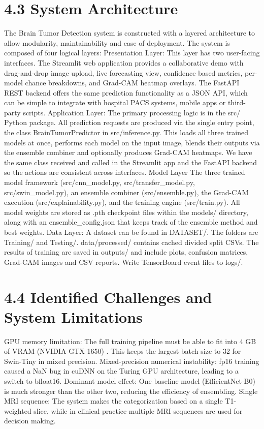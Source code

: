 \documentclass[12pt,a4paper,oneside]{report}
\begin{document}
\section{4.3 System Architecture}
The Brain Tumor Detection system is constructed with a layered architecture to allow modularity, maintainability and ease of deployment. The system is composed of four logical layers:
Presentation Layer: This layer has two user-facing interfaces. The Streamlit web application provides a collaborative demo with drag-and-drop image upload, live forecasting view, confidence based metrics, per-model chance breakdowns, and Grad-CAM heatmap overlays. The FastAPI REST backend offers the same prediction functionality as a JSON API, which can be simple to integrate with hospital PACS systems, mobile apps or third-party scripts. 
Application Layer: The primary processing logic is in the src/ Python package. All prediction requests are produced via the single entry point, the class BrainTumorPredictor in src/inference.py. This loads all three trained models at once, performs each model on the input image, blends their outputs via the ensemble combiner and optionally produces Grad-CAM heatmaps. We have the same class received and called in the Streamlit app and the FastAPI backend so the actions are consistent across interfaces.
Model Layer The three trained model framework (src/cnn\_model.py, src/transfer\_model.py, src/swin\_model.py), an ensemble combiner (src/ensemble.py), the Grad-CAM execution (src/explainability.py), and the training engine (src/train.py). All model weights are stored as .pth checkpoint files within the models/ directory, along with an ensemble\_config.json that keeps track of the ensemble method and best weights.
Data Layer: A dataset can be found in DATASET/. The folders are Training/ and Testing/. data/processed/ contains cached divided split CSVs. The results of training are saved in outputs/ and include plots, confusion matrices, Grad-CAM images and CSV reports. Write TensorBoard event files to logs/. 
\section{4.4 Identified Challenges and System Limitations}
GPU memory limitation: The full training pipeline must be able to fit into 4 GB of VRAM (NVIDIA GTX 1650) . This keeps the largest batch size to 32 for Swin-Tiny in mixed precision.
Mixed-precision numerical instability: fp16 training caused a NaN bug in cuDNN on the Turing GPU architecture, leading to a switch to bfloat16.
Dominant-model effect: One baseline model (EfficientNet-B0) is much stronger than the other two, reducing the efficiency of ensembling.
Single MRI sequence: The system makes the categorization based on a single T1-weighted slice, while in clinical practice multiple MRI sequences are used for decision making.
\end{document}
